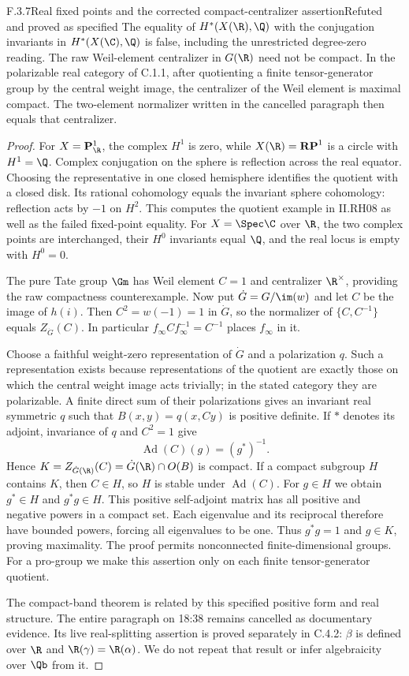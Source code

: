 \begin{result}{F.3.7}{Real fixed points and the corrected compact-centralizer assertion}{Refuted and proved as specified}
The equality of $H^*(X(\R),\Q)$ with the conjugation invariants in $H^*(X(\C),\Q)$ is false, including the unrestricted degree-zero reading. The raw Weil-element centralizer in $G(\R)$ need not be compact. In the polarizable real category of C.1.1, after quotienting a finite tensor-generator group by the central weight image, the centralizer of the Weil element is maximal compact. The two-element normalizer written in the cancelled paragraph then equals that centralizer.
\end{result}
\begin{proof}
For $X=\mathbf P^1_\R$, the complex $H^1$ is zero, while $X(\R)=\mathbf{RP}^1$ is a circle with $H^1=\Q$. Complex conjugation on the sphere is reflection across the real equator. Choosing the representative in one closed hemisphere identifies the quotient with a closed disk. Its rational cohomology equals the invariant sphere cohomology: reflection acts by $-1$ on $H^2$. This computes the quotient example in II.RH08 as well as the failed fixed-point equality. For $X=\Spec\C$ over $\R$, the two complex points are interchanged, their $H^0$ invariants equal $\Q$, and the real locus is empty with $H^0=0$.

The pure Tate group $\Gm$ has Weil element $C=1$ and centralizer $\R^\times$, providing the raw compactness counterexample. Now put $\dot G=G/\im(w)$ and let $C$ be the image of $h(i)$. Then $C^2=w(-1)=1$ in $\dot G$, so the normalizer of $\{C,C^{-1}\}$ equals $Z_{\dot G}(C)$. In particular $f_\infty C f_\infty^{-1}=C^{-1}$ places $f_\infty$ in it.

Choose a faithful weight-zero representation of $\dot G$ and a polarization $q$. Such a representation exists because representations of the quotient are exactly those on which the central weight image acts trivially; in the stated category they are polarizable. A finite direct sum of their polarizations gives an invariant real symmetric $q$ such that $B(x,y)=q(x,Cy)$ is positive definite. If $*$ denotes its adjoint, invariance of $q$ and $C^2=1$ give
\[
 \operatorname{Ad}(C)(g)=(g^*)^{-1}.
\]
Hence $K=Z_{\dot G(\R)}(C)=\dot G(\R)\cap O(B)$ is compact. If a compact subgroup $H$ contains $K$, then $C\in H$, so $H$ is stable under $\operatorname{Ad}(C)$. For $g\in H$ we obtain $g^*\in H$ and $g^*g\in H$. This positive self-adjoint matrix has all positive and negative powers in a compact set. Each eigenvalue and its reciprocal therefore have bounded powers, forcing all eigenvalues to be one. Thus $g^*g=1$ and $g\in K$, proving maximality. The proof permits nonconnected finite-dimensional groups. For a pro-group we make this assertion only on each finite tensor-generator quotient.

The compact-band theorem \cite[Theorem 4.17(a)]{DM1982} is related by this specified positive form and real structure. The entire paragraph on 18:38 remains cancelled as documentary evidence. Its live real-splitting assertion is proved separately in C.4.2: $\beta$ is defined over $\R$ and $\R(\gamma)=\R(\alpha)$. We do not repeat that result or infer algebraicity over $\Qb$ from it.
\end{proof}

